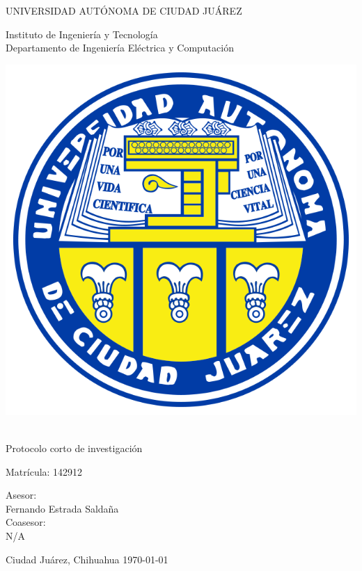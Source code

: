 \thispagestyle{empty}

\begin{center} \vfill

{\Large UNIVERSIDAD AUTÓNOMA DE CIUDAD JUÁREZ}\\
\vspace{6mm}
{\large Instituto de Ingeniería y Tecnología\\
\vspace{6mm}
Departamento de Ingeniería Eléctrica y Computación
\vspace{20mm}

\includegraphics [scale=0.7]{images/escudo-uacj.png}
\vspace{10mm}

\thetitle\\

\vspace{15mm}
Protocolo corto de investigación\\
\vspace{5mm}

\theauthor\hspace{10mm} Matrícula: 142912\\
\vspace{15mm}

Asesor:\\
Fernando Estrada Saldaña
\\
\vspace{5mm}
Coasesor:\\
N/A
\\
} \vfill
	Ciudad Juárez, Chihuahua \hspace{30mm}\today


\end{center}

